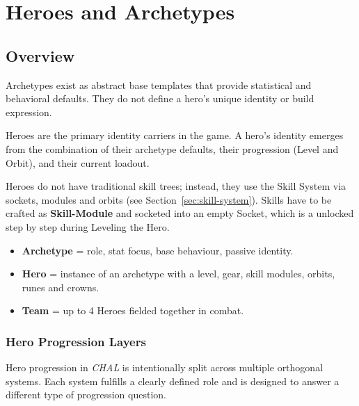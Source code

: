 \section{Heroes and Archetypes}
\label{sec:heroes-system}

\subsection{Overview}

Archetypes exist as abstract base templates that provide statistical and behavioral defaults.
They do not define a hero’s unique identity or build expression.

Heroes are the primary identity carriers in the game.
A hero’s identity emerges from the combination of their archetype defaults, their progression (Level and Orbit), and their current loadout.

Heroes do not have traditional skill trees; instead, they use the Skill System via sockets, modules and orbits 
(see Section~\ref{sec:skill-system}). Skills have to be crafted as \textbf{Skill-Module} and socketed into an empty Socket, which is a unlocked step by step during Leveling the Hero.\\

\begin{itemize}
	\item \textbf{Archetype} = role, stat focus, base behaviour, passive identity.
	\item \textbf{Hero} = instance of an archetype with a level, gear, skill modules, orbits, runes and crowns.
	\item \textbf{Team} = up to 4 Heroes fielded together in combat.
\end{itemize}

\subsubsection{Hero Progression Layers}

Hero progression in \textit{CHAL} is intentionally split across multiple orthogonal systems.
Each system fulfills a clearly defined role and is designed to answer a different type of progression question.

